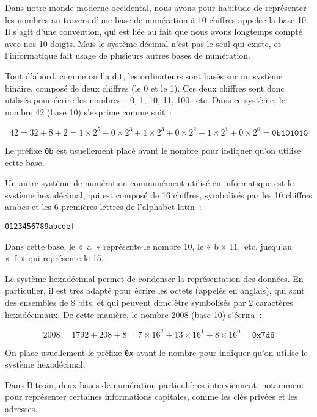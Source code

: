 Dans notre monde moderne occidental, nous avons pour habitude de représenter les nombres au travers d'une base de numération à 10 chiffres appelée la base 10. Il s'agit d'une convention, qui est liée au fait que nous avons longtemps compté avec nos 10 doigts. Mais le système décimal n'est pas le seul qui existe, et l'informatique fait usage de plusieurs autres bases de numération.

Tout d'abord, comme on l'a dit, les ordinateurs sont basés sur un système binaire, composé de deux chiffres (le 0 et le 1). Ces deux chiffres sont donc utilisés pour écrire les nombres~: 0, 1, 10, 11, 100,~etc. Dans ce système, le nombre 42 (base 10) s'exprime comme suit~:

\[
42 = 32 + 8 + 2 = 1 \times 2^5 + 0 \times 2^3 + 1 \times 2^3 + 0 \times 2^2 + 1 \times 2^1 + 0 \times 2^0 = \mathtt{0b101010}
\]

Le préfixe \verb?0b? est usuellement placé avant le nombre pour indiquer qu'on utilise cette base.


Un autre système de numération communément utilisé en informatique est le système hexadécimal, qui est composé de 16 chiffres, symbolisés par les 10 chiffres arabes et les 6 premières lettres de l'alphabet latin~: 

\begin{verbatim}
0123456789abcdef
\end{verbatim}

Dans cette base, le «~a~» représente le nombre 10, le « b » 11,~etc. jusqu'au «~f~» qui représente le 15.

Le système hexadécimal permet de condenser la représentation des données. En particulier, il est très adapté pour écrire les octets (appelés  en anglais), qui sont des ensembles de 8 bits, et qui peuvent donc être symbolisés par 2 caractères hexadécimaux. De cette manière, le nombre 2008 (base 10) s'écrira~:

\[
2008 = 1792 + 208 + 8 = 7 \times 16^2 + 13 \times 16^1 + 8 \times 16^0 = \mathtt{0x7d8}
\]

On place usuellement le préfixe \verb?0x? avant le nombre pour indiquer qu'on utilise le système hexadécimal.


Dans Bitcoin, deux bases de numération particulières interviennent, notamment pour représenter certaines informations capitales, comme les clés privées et les adresses.

